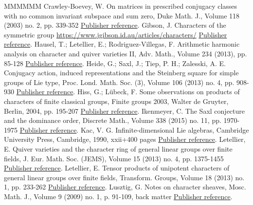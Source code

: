 \begin{thebibliography}{MMMMMM}
 Crawley-Boevey, W. On matrices in prescribed conjugacy classes with no common invariant subspace and sum zero, Duke Math. J., Volume 118 (2003) no. 2, pp. 339-352 \href{https://alco.centre-mersenne.org/articles/10.5802/alco.434/#CB}{Publisher reference}.
 Gibson, J. Characters of the symmetric group \url{https://www.jgibson.id.au/articles/characters/} \href{https://alco.centre-mersenne.org/articles/10.5802/alco.434/#Gi}{Publisher reference}.
 Hausel, T.; Letellier, E.; Rodriguez-Villegas, F. Arithmetic harmonic analysis on character and quiver varieties II, Adv. Math., Volume 234 (2013), pp. 85-128 \href{https://alco.centre-mersenne.org/articles/10.5802/alco.434/#hausel-letellier-villegas2}{Publisher reference}.
 Heide, G.; Saxl, J.; Tiep, P. H.; Zalesski, A. E. Conjugacy action, induced representations and the Steinberg square for simple groups of Lie type, Proc. Lond. Math. Soc. (3), Volume 106 (2013) no. 4, pp. 908-930 \href{https://alco.centre-mersenne.org/articles/10.5802/alco.434/#HSTZ}{Publisher reference}.
 Hiss, G.; Lübeck, F. Some observations on products of characters of finite classical groups, Finite groups 2003, Walter de Gruyter, Berlin, 2004, pp. 195-207 \href{https://alco.centre-mersenne.org/articles/10.5802/alco.434/#HLM}{Publisher reference}.
 Ikenmeyer, C. The Saxl conjecture and the dominance order, Discrete Math., Volume 338 (2015) no. 11, pp. 1970-1975 \href{https://alco.centre-mersenne.org/articles/10.5802/alco.434/#Ik}{Publisher reference}.
 Kac, V. G. Infinite-dimensional Lie algebras, Cambridge University Press, Cambridge, 1990, xxii+400 pages \href{https://alco.centre-mersenne.org/articles/10.5802/alco.434/#kac}{Publisher reference}.
 Letellier, E. Quiver varieties and the character ring of general linear groups over finite fields, J. Eur. Math. Soc. (JEMS), Volume 15 (2013) no. 4, pp. 1375-1455 \href{https://alco.centre-mersenne.org/articles/10.5802/alco.434/#L2}{Publisher reference}.
 Letellier, E. Tensor products of unipotent characters of general linear groups over finite fields, Transform. Groups, Volume 18 (2013) no. 1, pp. 233-262 \href{https://alco.centre-mersenne.org/articles/10.5802/alco.434/#L1}{Publisher reference}.
 Lusztig, G. Notes on character sheaves, Mosc. Math. J., Volume 9 (2009) no. 1, p. 91-109, back matter \href{https://alco.centre-mersenne.org/articles/10.5802/alco.434/#Lu1}{Publisher reference}.

\end{thebibliography}
